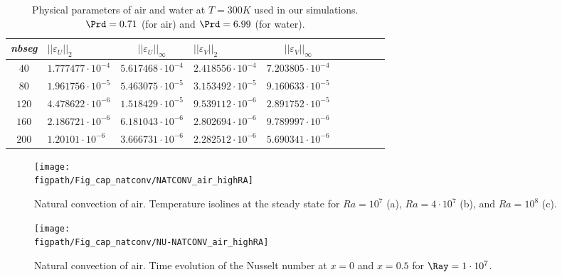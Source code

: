 \begin{table}
   \begin{center}
      \begin{tabular}{*{5}{cl}}
         
        {\em nbseg} &  $|| \varepsilon_U ||_{2}$ & $|| \varepsilon_U ||_{\infty}$ & $|| \varepsilon_V ||_{2}$ & $|| \varepsilon_V ||_{\infty}$ \\ \toprule
        $40$ & $1.777477 \cdot 10^{-4}$ & $5.617468 \cdot 10^{-4}$ & $2.418556 \cdot 10^{-4}$ & $7.203805 \cdot 10^{-4}$ \\
        $80$ & $1.961756 \cdot 10^{-5}$ & $5.463075 \cdot 10^{-5}$ & $3.153492 \cdot 10^{-5}$ & $9.160633 \cdot 10^{-5}$ \\
        $120$ & $4.478622 \cdot 10^{-6}$ & $1.518429 \cdot 10^{-5}$ & $9.539112 \cdot 10^{-6}$ & $2.891752 \cdot 10^{-5}$ \\
        $160$ & $2.186721 \cdot 10^{-6}$ & $6.181043 \cdot 10^{-6}$ & $2.802694 \cdot 10^{-6}$ & $9.789997 \cdot 10^{-6}$ \\
        $200$ & $1.20101 \cdot 10^{-6}$ & $3.666731 \cdot 10^{-6}$ & $2.282512 \cdot 10^{-6}$ & $5.690341 \cdot 10^{-6}$ \\
        
      \end{tabular}
   \end{center}
   \caption{Physical parameters of air and water at $T = 300K$ used in our simulations. $\Prd = 0.71$ (for air) and $\Prd = 6.99$ (for water).}
   \label{tab-mesh-conv-analysis}
\end{table}


\begin{figure}
	\begin{center}
		\texttt{[image: \\figpath/Fig\_cap\_natconv/NATCONV\_air\_highRA]} 
	\end{center}
	\caption{Natural convection of air. Temperature isolines at the steady state for $Ra = 10^7$ (a), $Ra = 4 \cdot 10^7$ (b), and  $Ra = 10^8$ (c).}
	\label{fig-natconv-T-highRa}
\end{figure}

\begin{figure}
	\begin{center}
		\texttt{[image: \\figpath/Fig\_cap\_natconv/NU-NATCONV\_air\_highRA]} 
	\end{center}
	\caption{Natural convection of air. Time evolution of the Nusselt number at $x=0$ and $x=0.5$ for $\Ray = 1 \cdot 10^7$.}
	\label{fig-natconv-NU-highRa}
\end{figure}

